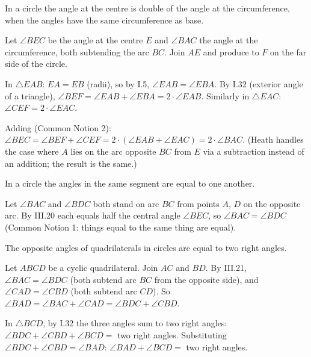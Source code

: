 \documentclass{rrxiv}
\begin{document}
\begin{claim}
\label{prop:III.20}
In a circle the angle at the centre is double of the angle at the
circumference, when the angles have the same circumference as base.
\end{claim}
\begin{evidence}
\label{ev:III.20}

Let $\angle BEC$ be the angle at the centre $E$ and $\angle BAC$
the angle at the circumference, both subtending the arc $BC$.
Join $AE$ and produce to $F$ on the far side of the circle.

In $\triangle EAB$: $EA = EB$ (radii), so by I.5, $\angle EAB =
\angle EBA$.  By I.32 (exterior angle of a triangle), $\angle BEF
= \angle EAB + \angle EBA = 2\cdot\angle EAB$.  Similarly in
$\triangle EAC$: $\angle CEF = 2\cdot\angle EAC$.

Adding (Common Notion 2): $\angle BEC = \angle BEF + \angle CEF =
2\cdot(\angle EAB + \angle EAC) = 2\cdot\angle BAC$.  (Heath
handles the case where $A$ lies on the arc opposite $BC$ from $E$
via a subtraction instead of an addition; the result is the same.)
\end{evidence}

\begin{claim}
\label{prop:III.21}
In a circle the angles in the same segment are equal to one another.
\end{claim}
\begin{evidence}
\label{ev:III.21}
Let $\angle BAC$ and $\angle BDC$ both stand on arc $BC$ from points
$A$, $D$ on the opposite arc.  By III.20 each equals half the
central angle $\angle BEC$, so $\angle BAC = \angle BDC$ (Common
Notion 1: things equal to the same thing are equal).
\end{evidence}

\begin{claim}
\label{prop:III.22}
The opposite angles of quadrilaterals in circles are equal to two
right angles.
\end{claim}
\begin{evidence}
\label{ev:III.22}
Let $ABCD$ be a cyclic quadrilateral.  Join $AC$ and $BD$.  By
III.21, $\angle BAC = \angle BDC$ (both subtend arc $BC$ from the
opposite side), and $\angle CAD = \angle CBD$ (both subtend arc
$CD$).  So $\angle BAD = \angle BAC + \angle CAD = \angle BDC +
\angle CBD$.

In $\triangle BCD$, by I.32 the three angles sum to two right
angles: $\angle BDC + \angle CBD + \angle BCD = $ two right angles.
Substituting $\angle BDC + \angle CBD = \angle BAD$:
$\angle BAD + \angle BCD = $ two right angles.
\end{evidence}
\end{document}
